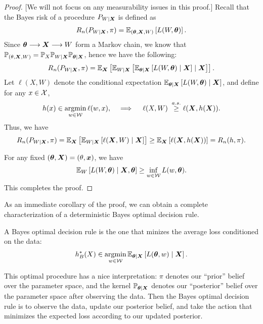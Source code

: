 \documentclass[12pt]{article}
\begin{document}
\begin{proof}

	[We will not focus on any measurability issues in this proof.]
Recall that the Bayes risk of a procedure $P_{W|{\boldsymbol X}}$ is defined as 
\begin{align}
	R_n(P_{W|{\boldsymbol X}}, \pi) = \mathbb{E}_{(\boldsymbol{\theta}, {\boldsymbol X}, W)}\left[  L(W, \boldsymbol{\theta})\right].  
\end{align}
Since $\boldsymbol{\theta} \longrightarrow {\boldsymbol X} \longrightarrow W$ form a Markov chain, we know that $\mathbb{P}_{(\theta, {\boldsymbol X}, W)} = \mathbb{P}_X \mathbb{P}_{W|{\boldsymbol X}} \mathbb{P}_{\boldsymbol{\theta}|{\boldsymbol X}}$, hence we have the following: 
\begin{align}
R_n(P_{W|{\boldsymbol X}}, \pi) = \mathbb{E}_{{\boldsymbol X}}\left[ \mathbb{E}_{W|{\boldsymbol X}} \left[ \mathbb{E}_{\boldsymbol{\theta}|{\boldsymbol X}} \left[  L(W, \boldsymbol{\theta}) \mid {\boldsymbol X}\right]  \mid {\boldsymbol X}\right]\right]. 
\end{align}
Let $\ell(X, W)$ denote the conditional expectation $\mathbb{E}_{\boldsymbol{\theta}|{\boldsymbol X}} \left[  L(W, \boldsymbol{\theta}) \mid {\boldsymbol X}\right]$, and define for any $x \in {\cal X}$, 
\begin{align}
h(x) \in \operatorname*{argmin}_{w \in {\cal W}} \ell(w, x), \quad \implies \quad 
\ell(X, W) \; \stackrel{a.s.}{\geq} \ell({\boldsymbol X}, h({\boldsymbol X})). 
\end{align}
Thus, we have 
\begin{align}
R_n(P_{W|{\boldsymbol X}}, \pi) = \mathbb{E}_{{\boldsymbol X}}\left[ \mathbb{E}_{W|{\boldsymbol X}}\left[ \ell({\boldsymbol X}, W) \mid {\boldsymbol X}\right] \right] \geq \mathbb{E}_{{\boldsymbol X}}\left[ \ell({\boldsymbol X}, h({\boldsymbol X})) \right] =  R_n(h, \pi). 
\end{align}

For any fixed $(\boldsymbol{\theta}, {\boldsymbol X}) = (\theta, {\boldsymbol{x}})$,  we have 
\begin{align}
	\mathbb{E}_{W}\left[ L(W, \boldsymbol{\theta}) \mid {\boldsymbol X}, \boldsymbol{\theta}\right] \geq \inf_{w \in {\cal W}} L(w, \boldsymbol{\theta}). 
\end{align}
This completes the proof. 
\end{proof}
As an immediate corollary of the proof, we can obtain a complete characterization of a deterministic Bayes optimal decision rule. 
\begin{corollary}
\label{corollary:bayes-optimal-rule}
A Bayes optimal decision rule is the one that minizes the average loss conditioned on the data: 
\begin{align}
h^*_B(X) \in \operatorname*{argmin}_{w \in {\cal W}} \mathbb{E}_{\boldsymbol{\theta}|{\boldsymbol X}} \left[ L(\boldsymbol{\theta}, w) \mid {\boldsymbol X} \right]. 
\end{align}
\end{corollary}
This optimal procedure has a nice interpretation: $\pi$ denotes our ``prior'' belief over the parameter space, and the kernel $\mathbb{P}_{\boldsymbol{\theta}|{\boldsymbol X}}$ denotes our ``posterior'' belief over the parameter space after observing the data. Then the Bayes optimal decision rule is to observe the data, update our posterior belief, and take the action that minimizes the expected loss according to our updated posterior. 
\end{document}
